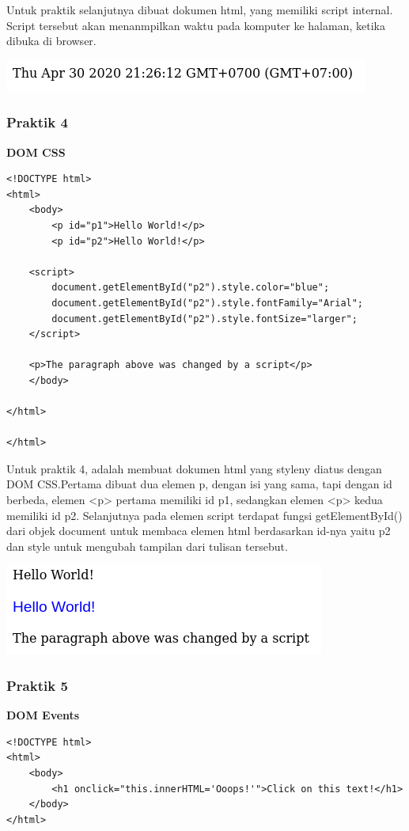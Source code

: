 \documentclass[a4paper,12pt]{article}
\begin{document}
Untuk praktik selanjutnya dibuat dokumen html, yang memiliki script internal. Script tersebut akan menanmpilkan waktu
pada komputer ke halaman, ketika dibuka di browser.
\begin{center}
    \includegraphics[scale=.7]{3.png} 
\end{center}

\subsubsection{Praktik 4}
\textbf{DOM CSS}
\begin{lstlisting}
<!DOCTYPE html>
<html>
    <body>
        <p id="p1">Hello World!</p>
        <p id="p2">Hello World!</p>

    <script>
        document.getElementById("p2").style.color="blue";
        document.getElementById("p2").style.fontFamily="Arial";
        document.getElementById("p2").style.fontSize="larger";
    </script>

    <p>The paragraph above was changed by a script</p>
    </body>

</html>

</html>
\end{lstlisting}
Untuk praktik 4, adalah membuat dokumen html yang styleny diatus dengan DOM CSS.\@ Pertama dibuat dua elemen p, dengan
isi yang sama, tapi dengan id berbeda, elemen <p> pertama memiliki id p1, sedangkan elemen <p> kedua memiliki id p2.
Selanjutnya pada elemen script terdapat fungsi getElementById() dari objek document untuk membaca elemen html
berdasarkan id-nya yaitu p2 dan style untuk mengubah tampilan dari tulisan tersebut.

\begin{center}
    \includegraphics[scale=.7]{4.png} 
\end{center}

\subsubsection{Praktik 5}
\textbf{DOM Events}
\begin{lstlisting}
<!DOCTYPE html>
<html>
    <body>
        <h1 onclick="this.innerHTML='Ooops!'">Click on this text!</h1>
    </body>
</html>
\end{lstlisting}
\end{document}
